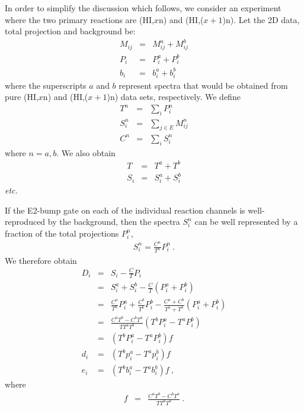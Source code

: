 In order to simplify the discussion which follows, we consider
an experiment where the two primary reactions are (HI,$x$n) and
(HI,($x+1$)n). Let the 2D data, total projection and background be:
\begin{eqnarray*}
M_{ij} & = & M^a_{ij} + M^b_{ij} \\
P_{i}  & = & P^a_{i}  + P^b_{i} \\
b_{i}  & = & b^a_{i}  + b^b_{i}
\end{eqnarray*}
where the superscripts $a$ and $b$ represent spectra that would be obtained
from pure (HI,$x$n) and (HI,($x+1$)n) data sets, respectively. We define
\begin{eqnarray*}
T^n   & = & \sum_i P^n_{i} \\
S^n_i & = & \sum_{j \in E} M^n_{ij} \\
C^n   & = & \sum_i S^n_{i}
\end{eqnarray*}
where $n = a, b$. We also obtain
\begin{eqnarray*}
T   & = & T^a + T^b \\
S_i & = & S^a_i + S^b_i
\end{eqnarray*}
{\em etc.}

If the E2-bump gate on each of the individual reaction channels is
well-reproduced by the background, then the spectra $S^n_i$ can be well
represented by a fraction of the total projections $P^n_i$,
\begin{eqnarray*}
S^n_i = \frac {C^n}{T^n} P^n_i \ .
\end{eqnarray*}
We therefore obtain
\begin{eqnarray}
D_i & = & S_i - \frac {C}{T} P_i                              \nonumber \\
    & = & S^a_i + S^b_i - \frac {C}{T} (P^a_i + P^b_i)        \nonumber  \\
    & = & \frac {C^a}{T^a} P^a_i + \frac {C^b}{T^b} P^b_i -
            \frac {C^a + C^b} {T^a + T^b} (P^a_i + P^b_i)     \nonumber \\
    & = & \frac {C^a T^b - C^b T^a} {T T^a T^b}
                          (T^b P^a_i - T^a P^b_i) \\
    & = & (T^b P^a_i - T^a P^b_i) f                           \label{eq:aaa} \\
d_i & = & (T^b p^a_i - T^a p^b_i) f                           \label{eq:bbb} \\ 
e_i & = & (T^b b^a_i - T^a b^b_i) f \ ,                       \label{eq:eee}
\end{eqnarray}
where
\begin{eqnarray}
f & = & \frac {C^a T^b - C^b T^a} {T T^a T^b} \ .             \label{eq:fff}
\end{eqnarray}

